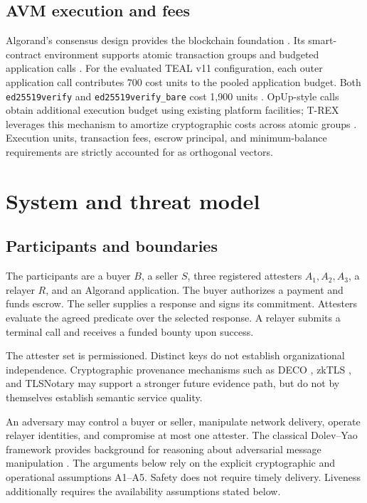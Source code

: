 \documentclass[fleqn,10pt,lineno]{wlpeerj}
\begin{document}
\subsection{AVM execution and fees}

Algorand's consensus design provides the blockchain foundation \citep{AlgorandMicali2017,gilad2017}. Its smart-contract environment supports atomic transaction groups and budgeted application calls \citep{algorand_costs}. For the evaluated TEAL v11 configuration, each outer application call contributes 700 cost units to the pooled application budget. Both \texttt{ed25519verify} and \texttt{ed25519verify\_bare} cost 1,900 units \citep{AlgorandOpcodeRef}. OpUp-style calls obtain additional execution budget using existing platform facilities; T-REX leverages this mechanism to amortize cryptographic costs across atomic groups \citep{pyteal_opup}. Execution units, transaction fees, escrow principal, and minimum-balance requirements are strictly accounted for as orthogonal vectors.

\section{System and threat model}

\subsection{Participants and boundaries}

The participants are a buyer $B$, a seller $S$, three registered attesters $A_1,A_2,A_3$, a relayer $R$, and an Algorand application. The buyer authorizes a payment and funds escrow. The seller supplies a response and signs its commitment. Attesters evaluate the agreed predicate over the selected response. A relayer submits a terminal call and receives a funded bounty upon success.

The attester set is permissioned. Distinct keys do not establish organizational independence. Cryptographic provenance mechanisms such as DECO \citep{deco}, zkTLS \citep{zktls}, and TLSNotary \citep{tlsnotary} may support a stronger future evidence path, but do not by themselves establish semantic service quality.

An adversary may control a buyer or seller, manipulate network delivery, operate relayer identities, and compromise at most one attester. The classical Dolev--Yao framework provides background for reasoning about adversarial message manipulation \citep{DolevYao1983}. The arguments below rely on the explicit cryptographic and operational assumptions A1--A5. Safety does not require timely delivery. Liveness additionally requires the availability assumptions stated below.
\end{document}
